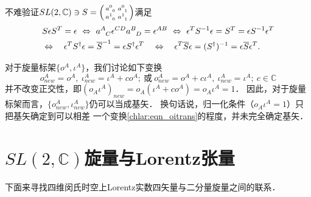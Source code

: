 不难验证$SL(2,\mathbb{C}) \ni S=\left(\begin{smallmatrix} a^0_{\hphantom{0} 0} & a^0_{\hphantom{0} 1} 
    \\ a^1_{\hphantom{0} 0} & a^1_{\hphantom{0} 1}  \end{smallmatrix}\right) $满足
\begin{equation}
    \begin{aligned}
        &S\epsilon S^T = \epsilon \ \Leftrightarrow \
        a^A_{\hphantom{A} C} \epsilon^{CD} a^B_{\hphantom{A} D} = \epsilon^{AB}  \ \Leftrightarrow \
        \epsilon^T S^{-1} \epsilon = S^T = \epsilon S^{-1} \epsilon^T   \\
        &  \Leftrightarrow \quad \epsilon^T S^{\dagger} \epsilon = \overline{S}^{-1}
        = \epsilon S^{\dagger} \epsilon^T \quad \Leftrightarrow \quad 
        \epsilon^T \overline{S} \epsilon = (S^\dagger)^{-1} = \epsilon \overline{S} \epsilon^T . 
    \end{aligned}
\end{equation}


对于旋量标架$\{o^A,\iota^A\}$，我们讨论如下变换
\begin{equation}\label{chlar:eqn_oitrans}
    o^A_{new} = o^A,\ \iota^A_{new} = \iota^A + c o^A;
    \ \text{或}\  
    o^A_{new} = o^A+c\iota^A ,\ \iota^A_{new} = \iota^A ;
    \ c\in \mathbb{C}
\end{equation}
并不改变正交性，即$(o_A\iota^A)_{new}= o_A(\iota^A + c o^A ) = o_A\iota^A=1$．
因此，对于旋量标架而言，$\{o^A_{new}, \iota^A_{new}\}$仍可以当成基矢．
换句话说，归一化条件（$o_A\iota^A=1$）只把基矢确定到可以相差
一个变换\eqref{chlar:eqn_oitrans}的程度，并未完全确定基矢．



\section{$SL(2,\mathbb{C})$旋量与Lorentz张量}\label{chlar:sec_sv}


下面来寻找四维闵氏时空上Lorentz实数四矢量与二分量旋量之间的联系．

